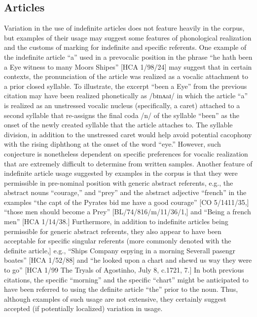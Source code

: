 \subsection{{Articles}}%

  Variation in the use of indefinite articles does not feature heavily in the corpus, but examples of their usage may suggest some features of phonological realization and the customs of marking for indefinite and specific referents. One example of the indefinite article “a” used in a prevocalic position in the phrase “he hath been a Eye witness to many Moors Shipes” [HCA 1/98/24] may suggest that in certain contexts, the pronunciation of the article was realized as a vocalic attachment to a prior closed syllable. To illustrate, the excerpt “been a Eye” from the previous citation may have been realized phonetically as /b{ɪ}nʌ{aɪ/ in which the article “a” is realized as an unstressed vocalic nucleus (specifically, a caret) attached to a second syllable that re-assigns the final coda /n/ of the syllable “been” as the onset of the newly created syllable that the article attaches to. The syllable division, in addition to the unstressed caret would help avoid potential cacophony with the rising diphthong at the onset of the word “eye.” However, such conjecture is nonetheless dependent on specific preferences for vocalic realization that are extremely difficult to determine from written samples. Another feature of indefinite article usage suggested by examples in the corpus is that they were permissible in pre-nominal position with generic abstract referents, e.g., the abstract nouns “courage,” and “prey” and the abstract adjective “french” in the examples} “the capt of the Pyrates bid me have a good courage” [CO 5/1411/35,] “those men should become a Prey” [BL/74/816/m/11/36/1,] and “Being a french men” [HCA 1/14/38.] Furthermore, in addition to indefinite articles being {permissible for generic abstract referents, they also appear to have been acceptable for specific singular referents (more commonly denoted with the definite article,] e.g.,} “Ships Company espying in a morning Severall pasengr boates” [HCA 1/52/88] and “he looked upon a chart and shewd us way they were to go” [HCA 1/99 The Tryals of Agostinho, July 8, c.1721, 7.] In both previous citations, the specific “morning” and the specific “chart” might be anticipated to have been referred to using the definite article “the” prior to the noun. Thus, although examples of such usage are not extensive, they certainly suggest accepted (if potentially localized) variation in usage. 

